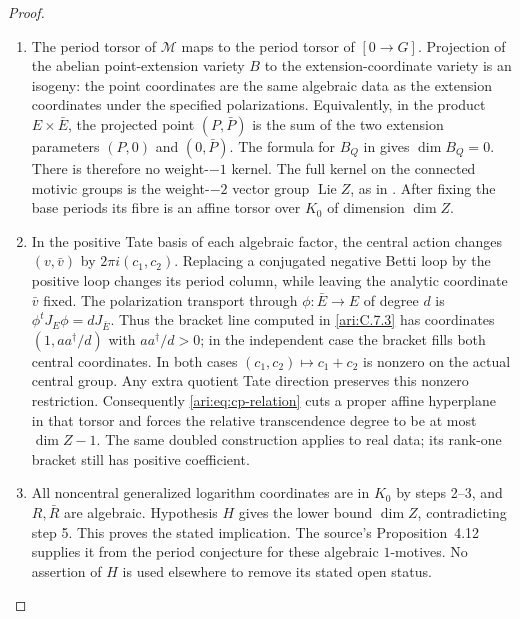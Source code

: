 \begin{proof}
\begin{enumerate}[label=\arabic*.,leftmargin=*]
\item The period torsor of $\mathcal M$ maps to the period
torsor of $[0\to G]$. Projection of the abelian point-extension
variety $B$ to the extension-coordinate variety is an isogeny:
the point coordinates are the same algebraic data as the
extension coordinates under the specified polarizations.
Equivalently, in the product $E\times\bar E$, the projected
point $(P,\bar P)$ is the sum of the two extension parameters
$(P,0)$ and $(0,\bar P)$. The formula for $B_Q$ in
\cite[equation~(4.4), p.~19]{bertolin2022} gives $\dim B_Q=0$.
There is therefore no weight-$-1$ kernel. The full kernel on
the connected motivic groups is the weight-$-2$ vector group
$\operatorname{Lie}Z$, as in
\cite[Construction~3.4 and Lemma~3.5, pp.~12--13]{bertolin2022}.
After fixing the base periods its fibre is an affine torsor
over $K_0$ of dimension $\dim Z$.

\item In the positive Tate basis of each algebraic factor,
the central action changes $(v,\bar v)$ by
$2\pi i(c_1,c_2)$. Replacing a conjugated negative Betti loop
by the positive loop changes its period column, while leaving
the analytic coordinate $\bar v$ fixed. The polarization
transport through $\phi:\bar E\to E$ of degree $d$ is
$\phi^tJ_E\phi=dJ_{\bar E}$. Thus the bracket line computed
in \cref{ari:C.7.3} has coordinates
$(1,aa^\dagger/d)$ with $aa^\dagger/d>0$; in the independent
case the bracket fills both central coordinates. In both cases
$(c_1,c_2)\mapsto c_1+c_2$ is nonzero on the actual central
group. Any extra quotient Tate direction preserves this
nonzero restriction. Consequently \eqref{ari:eq:cp-relation}
cuts a proper affine hyperplane in that torsor and forces the
relative transcendence degree to be at most $\dim Z-1$.
The same doubled construction applies to real data; its
rank-one bracket still has positive coefficient.

\item All noncentral generalized logarithm coordinates are in
$K_0$ by steps 2--3, and $R,\bar R$ are algebraic. Hypothesis
$H$ gives the lower bound $\dim Z$, contradicting step 5.
This proves the stated implication. The source's
Proposition~4.12 supplies it from the period conjecture for
these algebraic $1$-motives. No assertion of $H$ is used
elsewhere to remove its stated open status.
\end{enumerate}
\end{proof}
